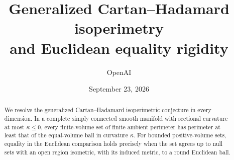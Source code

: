 \documentclass[11pt]{article}
\title{Generalized Cartan--Hadamard isoperimetry\\
and Euclidean equality rigidity}
\author{OpenAI}
\date{September 23, 2026}
\theoremstyle{definition}
\theoremstyle{remark}
\numberwithin{equation}{section}
\begin{document}
\maketitle
\begin{abstract}
We resolve the generalized Cartan--Hadamard isoperimetric conjecture
in every dimension. In a complete simply connected smooth manifold
with sectional curvature at most $\kappa\le0$, every finite-volume set
of finite ambient perimeter has perimeter at least that of the
equal-volume ball in curvature $\kappa$. For bounded positive-volume
sets, equality in the Euclidean comparison holds precisely when the set
agrees up to null sets with an open region isometric, with its induced
metric, to a round Euclidean ball.
\end{abstract}
\tableofcontents
\clearpage











\end{document}
